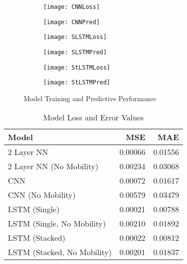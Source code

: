 ﻿\documentclass{article}
\begin{document}
  \begin{figure}[!htb]
    \begin{subfigure}{.5\textwidth}
      \centering
      \texttt{[image: CNNLoss]}
      \label{fig:sfig1}
    \end{subfigure}
    \begin{subfigure}{.5\textwidth}
      \centering
      \texttt{[image: CNNPred]}
      \label{fig:sfig2}
    \end{subfigure}
    \begin{subfigure}{.5\textwidth}
      \centering
      \texttt{[image: SLSTMLoss]}
      \label{fig:sfig3}
    \end{subfigure}
    \begin{subfigure}{.5\textwidth}
      \centering
      \texttt{[image: SLSTMPred]}
      \label{fig:sfig4}
    \end{subfigure}
    \begin{subfigure}{.5\textwidth}
      \centering
      \texttt{[image: StLSTMLoss]}
      \label{fig:sfig5}
    \end{subfigure}
    \begin{subfigure}{.5\textwidth}
      \centering
      \texttt{[image: StLSTMPred]}
      \label{fig:sfig6}
    \end{subfigure}
    \caption{Model Training and Predictive Performance}
    \label{fig:fig1}
  \end{figure}

  \begin{table}[h!]
  \begin{centering}
  \begin{tabular}{l | r | r }
    
    Model & MSE & MAE \\
    \hline
    2 Layer NN & 0.00066 & 0.01556 \\
    2 Layer NN (No Mobility) & 0.00234 & 0.03068 \\
    CNN & 0.00072 & 0.01617 \\
    CNN (No Mobility) & 0.00579 & 0.03479 \\
    LSTM (Single) & 0.00021 & 0.00788 \\
    LSTM (Single, No Mobility) & 0.00210 & 0.01892 \\
    LSTM (Stacked) & 0.00022 & 0.00812 \\
    LSTM (Stacked, No Mobility) & 0.00201 & 0.01837 \\
                               
  \end{tabular}
  \caption{Model Loss and Error Values}
  \label{table:1}
  \end{centering}
\end{table}
\end{document}
